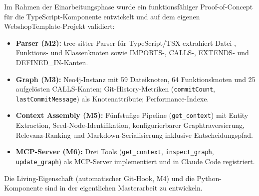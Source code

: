 \begin{tcolorbox}[colback=blue!4!white, colframe=blue!40!black, title=Proof-of-Concept bereits implementiert, fonttitle=\bfseries]
Im Rahmen der Einarbeitungsphase wurde ein funktionsfähiger Proof-of-Concept für die TypeScript-Komponente entwickelt und auf dem eigenen WebshopTemplate-Projekt validiert:

\begin{itemize}[noitemsep]
  \item \textbf{Parser (M2):} tree-sitter-Parser für TypeScript/TSX extrahiert Datei-, Funktions- und Klassenknoten sowie IMPORTS-, CALLS-, EXTENDS- und DEFINED\_IN-Kanten.
  \item \textbf{Graph (M3):} Neo4j-Instanz mit 59 Dateiknoten, 64 Funktionsknoten und 25 aufgelösten CALLS-Kanten; Git-History-Metriken (\texttt{commitCount}, \texttt{lastCommitMessage}) als Knotenattribute; Performance-Indexe.
  \item \textbf{Context Assembly (M5):} Fünfstufige Pipeline (\texttt{get\_context}) mit Entity Extraction, Seed-Node-Identifikation, konfigurierbarer Graphtraversierung, Relevanz-Ranking und Markdown-Serialisierung inklusive Entscheidungspfad.
  \item \textbf{MCP-Server (M6):} Drei Tools (\texttt{get\_context}, \texttt{inspect\_graph}, \texttt{update\_graph}) als MCP-Server implementiert und in Claude Code registriert.
\end{itemize}

Die Living-Eigenschaft (automatischer Git-Hook, M4) und die Python-Komponente sind in der eigentlichen Masterarbeit zu entwickeln.
\end{tcolorbox}
